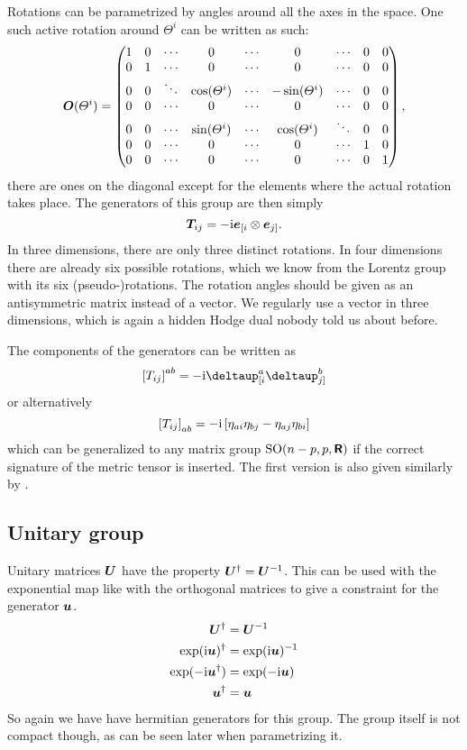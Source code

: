 \documentclass[11pt, english, fleqn, DIV=15, headinclude, BCOR=1cm]{scrartcl}
\begin{document}
Rotations can be parametrized by angles around all the axes in the space. One
such active rotation around $\Theta^i$ can be written as such:
\[
    \mat O(\Theta^i) =
    \begin{pmatrix}
        1 & 0 & \cdots & 0 & \cdots & 0 & \cdots & 0 & 0 \\
        0 & 1 & \cdots & 0 & \cdots & 0 & \cdots & 0 & 0 \\
        0 & 0 & \ddots & \cos(\Theta^i) & \cdots & -\sin(\Theta^i) & \cdots & 0 & 0 \\
        0 & 0 & \cdots & 0 & \cdots & 0 & \cdots & 0 & 0 \\
        0 & 0 & \cdots & \sin(\Theta^i) & \cdots & \cos(\Theta^i) & \ddots & 0 & 0 \\
        0 & 0 & \cdots & 0 & \cdots & 0 & \cdots & 1 & 0 \\
        0 & 0 & \cdots & 0 & \cdots & 0 & \cdots & 0 & 1 \\
    \end{pmatrix},
\]
there are ones on the diagonal except for the elements where the actual
rotation takes place. The generators of this group are then simply
\[
    \mat T_{ij} = -\iup \ev_{[i} \otimes \ev_{j]}.
\]
In three dimensions, there are only three distinct rotations. In four
dimensions there are already six possible rotations, which we know from the
Lorentz group with its six (pseudo-)rotations. The rotation angles should be
given as an antisymmetric matrix instead of a vector. We regularly use a vector
in three dimensions, which is again a hidden Hodge dual nobody told us about
before.

The components of the generators can be written as
\[
    \sbr{T_{ij}}^{ab} = - \iup \deltaup^a_{[i} \deltaup^b_{j]}
\]
or alternatively
\[
    \left[ T_{ij} \right]_{ab} = - \mathrm i \left[ 
        \eta_{ai} \eta_{bj} - \eta_{aj} \eta_{bi}
     \right]
\]
which can be generalized to any matrix group $\mathrm{SO}(n-p, p, \text{\bfseries\sffamily R})$ if the
correct signature of the metric tensor is inserted. The first version is also
given similarly by \textcite[(3.18)]{Peskin/QFT/1995}.

\subsection{Unitary group}

Unitary matrices $\mat U$ have the property $\mat U^\dagger = \mat U\inv$. This
can be used with the exponential map like with the orthogonal matrices to give
a constraint for the generator $\mat u$.
\begin{align*}
    \mat U^\dagger &= \mat U\inv \\
    \exp(\iup \mat u)^\dagger &= \exp(\iup \mat u)\inv \\
    \exp(- \iup \mat u^\dagger) &= \exp(- \iup \mat u) \\
    \mat u^\dagger &= \mat u
\end{align*}
So again we have have hermitian generators for this group. The group itself is
not compact though, as can be seen later when parametrizing it.
\end{document}
